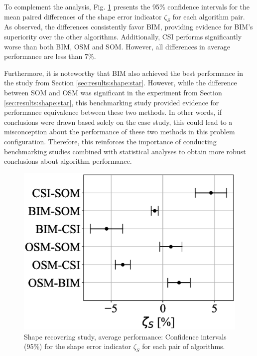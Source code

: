 \documentclass{IEEEtran}
\begin{document}
                To complement the analysis, Fig. \ref{fig:shape:average:confidence_intervals} presents the 95\% confidence intervals for the mean paired differences of the shape error indicator $\zeta_S$ for each algorithm pair. As observed, the differences consistently favor BIM, providing evidence for BIM's superiority over the other algorithms. Additionally, CSI performs significantly worse than both BIM, OSM and SOM. However, all differences in average performance are less than 7\%.

                Furthermore, it is noteworthy that BIM also achieved the best performance in the study from Section \ref{sec:results:shape:star}. However, while the difference between SOM and OSM was significant in the experiment from Section \ref{sec:results:shape:star}, this benchmarking study provided evidence for performance equivalence between these two methods. In other words, if conclusions were drawn based solely on the case study, this could lead to a misconception about the performance of these two methods in this problem configuration. Therefore, this reinforces the importance of conducting benchmarking studies combined with statistical analyses to obtain more robust conclusions about algorithm performance.

                \begin{figure}
                    \centering
                    \includegraphics[width=.8\columnwidth]{./experiments/shape/average/figs/confidence_intervals.eps}
                    \caption{Shape recovering study, average performance: Confidence intervals (95\%) for the shape error indicator $\zeta_S$ for each pair of algorithms.}
                    \label{fig:shape:average:confidence_intervals}
                \end{figure}
\end{document}
